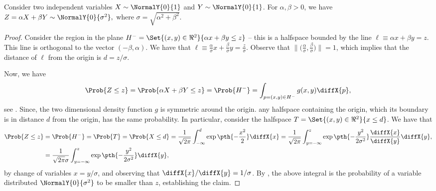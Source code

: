\begin{lemma}
    Consider two independent variables $X \sim \NormalY{0}{1}$ and
    $Y \sim \NormalY{0}{1}$. For $\alpha,\beta > 0$, we have
    \begin{math}
        Z = \alpha X+\beta Y \sim \NormalY{ 0}{ \sigma^2},
    \end{math}
    where $\sigma = \sqrt{\alpha^2 + \beta^2}$.
\end{lemma}
\begin{proof}
    Consider the region in the plane
    $H^- = \Set{ (x,y)\in\Re^2}{ \alpha x + \beta y \leq z}$ -- this
    is a halfspace bounded by the line
    $\ell \equiv \alpha x + \beta y = z $. This line is orthogonal to
    the vector $(-\beta,\alpha)$. We have that
    $\ell \equiv \frac{\alpha}{\sigma} x + \frac{\beta}{\sigma} y =
    \frac{z}{\sigma} $. Observe that
    $\bigl\|\bigl( \frac{\alpha}{\sigma}, \frac{\beta}{\sigma}
    \bigr)\bigr\|=1$, which implies that the distance of $\ell$ from
    the origin is $d = z/\sigma$.

    Now, we have
    \begin{equation*}
        \Prob{Z \leq z}%
        =%
        \Prob{\alpha X + \beta Y \leq z}
        =%
        \Prob{H^-}%
        =%
        \int_{p=(x,y)\in H^-} g(x,y) \diffX{p},
    \end{equation*}
    see .  Since, the two dimensional density
    function $g$ is symmetric around the origin. any halfspace
    containing the origin, which its boundary is in distance $d$ from
    the origin, has the same probability. In particular, consider the
    halfspace $T=\Set{ (x,y)\in\Re^2}{ x \leq d}$. We have that
    \begin{align*}
      \Prob{Z \leq z}%
      &=%
        \Prob{H^-}%
        =%
        \Prob{T}%
        =%
        \Prob{X \leq d} %
        =%
        \frac{1}{\sqrt{2\pi}}\int_{-\infty}^d \exp\pth{-\frac{x^2}{2}} \diffX{x}
      =%
      \frac{1}{\sqrt{2\pi } }\int_{y=-\infty}^z
      \exp\pth{-\frac{y^2}{2\sigma^2}} \frac{\diffX{x}}{ \diffX{y}} \diffX{y},
      \\&%
      =%
      \frac{1}{\sqrt{2\pi } \sigma}\int_{y=-\infty}^z
      \exp\pth{-\frac{y^2}{2\sigma^2}}  \diffX{y},
    \end{align*}
    by change of variables $x = y/\sigma$, and observing that
    $\diffX{x} / \diffX{y} = 1/\sigma$. By ,
    the above integral is the probability of a variable distributed
    $\NormalY{0}{\sigma^2}$ to be smaller than $z$, establishing the
    claim.
\end{proof}


